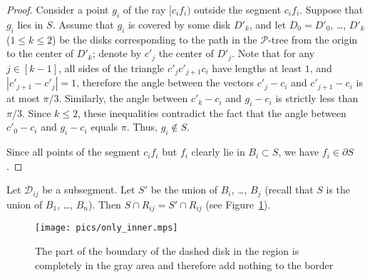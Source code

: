 \begin{proof}
Consider a point $g_i$ of the ray $[c_if_i)$ outside the segment $c_if_i$. Suppose that $g_i$ lies in $S$.
Assume that $g_i$ is covered by some disk $D'_k$, and let $D_0 = D'_0$, \ldots, $D'_k$ ($1\leq k\leq 2$) be the disks corresponding to the path in the $\mathcal{P}$-tree from the origin to the center of $D'_k$; denote by $c'_j$ the center of $D'_j$.
Note that for any $j\in[k - 1]$, all sides of the triangle $c'_jc'_{j+1}c_i$ have lengths at least $1$, and $|c'_{j+1} - c'_j| = 1$, therefore the angle between the vectors $c'_j - c_i$ and $c'_{j+1} - c_i$ is at most $\pi/3$. Similarly, the angle between $c'_k - c_i$ and $g_i - c_i$ is strictly less than $\pi/3$. Since $k\leq 2$, these inequalities contradict the fact that the angle between $c'_0 - c_i$ and $g_i - c_i$ equals $\pi$. Thus, $g_i\notin S$.

Since all points of the segment $c_if_i$ but $f_i$ clearly lie in $B_i\subset S$, we have $f_i\in\partial{S}$.
\end{proof}


\begin{lemma}
Let $\mathcal{D}_{ij}$ be a subsegment. Let $S'$ be the union of $B_i$, \ldots, $B_j$ (recall that $S$ is the union of $B_1$, \ldots, $B_n$). Then $S\cap R_{ij} = S'\cap R_{ij}$  (see Figure~\ref{fig:only_inner}).

\label{lemma:only_inner}
\end{lemma}

\begin{figure}[h!]
    \centering
    \texttt{[image: pics/only\_inner.mps]}
    \captionsetup{width=.7\textwidth}
    \caption{The part of the boundary of the dashed disk in the region is completely in the gray area and therefore add nothing to the border}
    \label{fig:only_inner}
\end{figure}

